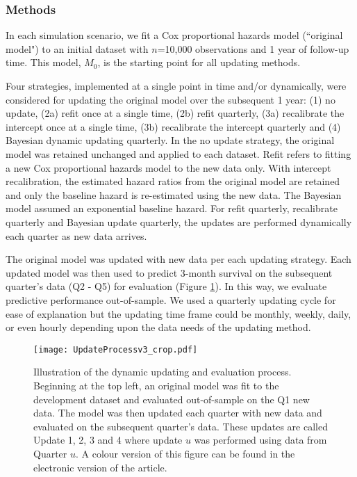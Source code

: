 \documentclass[]{article}
\begin{document}
\subsubsection{Methods}

In each simulation scenario, we fit a Cox proportional hazards model (``original model") to an initial dataset with $n$=10,000 observations and 1 year of follow-up time. This model, $M_0$, is the starting point for all updating methods. 

Four strategies, implemented at a single point in time and/or dynamically, were considered for updating the original model over the subsequent 1 year: (1) no update, (2a) refit once at a single time, (2b) refit quarterly, (3a) recalibrate the intercept once at a single time, (3b) recalibrate the intercept quarterly and (4) Bayesian dynamic updating quarterly. In the no update strategy, the original model was retained unchanged and applied to each dataset. Refit refers to fitting a new Cox proportional hazards model to the new data only. With intercept recalibration, the estimated hazard ratios from the original model are retained and only the baseline hazard is re-estimated using the new data. The Bayesian model assumed an exponential baseline hazard. For refit quarterly, recalibrate quarterly and Bayesian update quarterly, the updates are performed dynamically each quarter as new data arrives. 

The original model was updated with new data per each updating strategy. Each updated model was then used to predict 3-month survival on the subsequent quarter's data (Q2 - Q5) for evaluation (Figure \ref{fig:UpdateProcess}). In this way, we evaluate predictive performance out-of-sample. We used a quarterly updating cycle for ease of explanation but the updating time frame could be monthly, weekly, daily, or even hourly depending upon the data needs of the updating method. 

\begin{figure}
	{\texttt{[image: UpdateProcessv3\_crop.pdf]}}
	\caption{Illustration of the dynamic updating and evaluation process. Beginning at the top left, an original model was fit to the development dataset and evaluated out-of-sample on the Q1 new data. The model was then updated each quarter with new data and evaluated on the subsequent quarter's data. These updates are called Update 1, 2, 3 and 4 where update $u$ was performed using data from Quarter $u$. A colour version of this figure can be found in the electronic version of the article.}
	\label{fig:UpdateProcess}
\end{figure}
\end{document}
